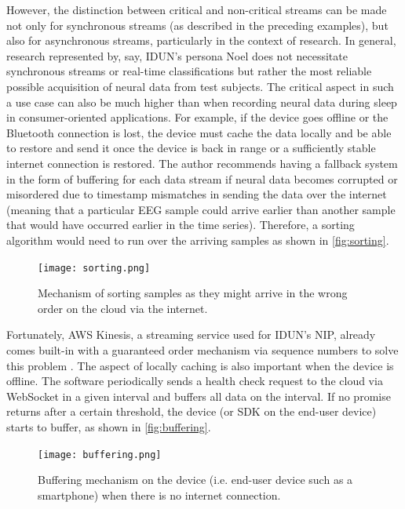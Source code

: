 However, the distinction between critical and non-critical streams can be made not only for synchronous streams (as described in the preceding examples), but also for asynchronous streams, particularly in the context of research. In general, research represented by, say, IDUN’s persona Noel does not necessitate synchronous streams or real-time classifications but rather the most reliable possible acquisition of neural data from test subjects. The critical aspect in such a use case can also be much higher than when recording neural data during sleep in consumer-oriented applications. For example, if the device goes offline or the Bluetooth connection is lost, the device must cache the data locally and be able to restore and send it once the device is back in range or a sufficiently stable internet connection is restored. The author recommends having a fallback system in the form of buffering for each data stream if neural data becomes corrupted or misordered due to timestamp mismatches in sending the data over the internet (meaning that a particular EEG sample could arrive earlier than another sample that would have occurred earlier in the time series). Therefore, a sorting algorithm would need to run over the arriving samples as shown in \autoref{fig:sorting}.

\begin{figure}[!ht]
  \centering
  \texttt{[image: sorting.png]}
  \caption{Mechanism of sorting samples as they might arrive in the wrong order on the cloud via the internet.}
  \label{fig:sorting}
\end{figure}

Fortunately, AWS Kinesis, a streaming service used for IDUN's NIP, already comes built-in with a guaranteed order mechanism via sequence numbers to solve this problem \citep{amazon_web_services_inc_amazon_nodate}. The aspect of locally caching is also important when the device is offline. The software periodically sends a health check request to the cloud via WebSocket in a given interval and buffers all data on the interval. If no promise returns after a certain threshold, the device (or SDK on the end-user device) starts to buffer, as shown in \autoref{fig:buffering}.

\begin{figure}[!ht]
  \centering
  \texttt{[image: buffering.png]}
  \caption{Buffering mechanism on the device (i.e. end-user device such as a smartphone) when there is no internet connection.}
  \label{fig:buffering}
\end{figure}

